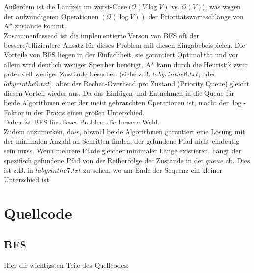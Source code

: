 \documentclass[a4paper,10pt,ngerman]{scrartcl}
\begin{document}
Außerdem ist die Laufzeit im worst-Case $(\mathcal{O}(V \log V)$ vs. $\mathcal{O}(V)$), was wegen der aufwändigeren Operationen $(\mathcal{O}(\log V))$ der Prioritätswarteschlange von A* zustande kommt.\\
Zusammenfassend ist die implementierte Verson von BFS oft der bessere/effizientere Ansatz für dieses Problem mit diesen Eingabebeispielen. Die Vorteile von BFS liegen in der Einfachheit, sie garantiert Optimalität und vor allem wird deutlich weniger Speicher benötigt. A* kann durch die Heuristik zwar potenziell weniger Zustände besuchen (siehe z.B. $labyrinthe8.txt$, oder $labyrinthe9.txt$), aber der Rechen-Overhead pro Zustand (Priority Queue) gleicht diesen Vorteil wieder aus. Da das Einfügen und Entnehmen in die Queue für beide Algorithmen einer der meist gebrauchten Operationen ist, macht der $\log$-Faktor in der Praxis einen großen Unterschied. \\
Daher ist BFS für dieses Problem die bessere Wahl.\\\newline
Zudem anzumerken, dass, obwohl beide Algorithmen garantiert eine Lösung mit der minimalen Anzahl an Schritten finden, der gefundene Pfad nicht eindeutig sein muss. Wenn mehrere Pfade gleicher minimaler Länge existieren, hängt der spezifisch gefundene Pfad von der Reihenfolge der Zustände in der $queue$ ab. Dies ist z.B. in $labyrinthe7.txt$ zu sehen, wo am Ende der Sequenz ein kleiner Unterschied ist.


\section{Quellcode}
\subsection{BFS}
Hier die wichtigsten Teile des Quellcodes:\\
\end{document}
